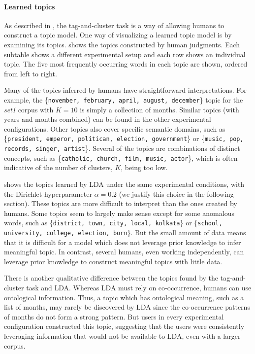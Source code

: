 \paragraph{Learned topics} As described in , the tag-and-cluster
task is a way of allowing humans to construct a topic model.  One way
of visualizing a learned topic model is by examining its topics.
 shows the topics constructed by human
judgments.  Each subtable shows a different experimental setup and
each row shows an individual topic.  The five most frequently
occurring words in each topic are shown, ordered from left to right.

Many of the topics inferred by humans have straightforward
interpretations.  For example, the \{\texttt{november, february,
  april, august, december}\} topic for the \emph{set1} corpus with
$K=10$ is simply a collection of months.  Similar topics (with years
and months combined) can be found in the other experimental
configurations.  Other topics also cover specific semantic domains,
such as \{\texttt{president, emperor, politican, election,
  government}\} or \{\texttt{music, pop, records, singer, artist}\}.
Several of the topics are combinations of distinct concepts, such as
\{\texttt{catholic, church, film, music, actor}\}, which is often
indicative of the number of clusters, $K$, being too low.

 shows the topics learned by LDA under
the same experimental conditions, with the Dirichlet hyperparameter
$\alpha = 0.2$ (we justify this choice in the following section).
These topics are more difficult to interpret than the ones created by
humans.  Some topics seem to largely make sense except for some
anomalous words, such as \{\texttt{district, town, city, local,
  kolkata}\} or \{\texttt{school, university, college, election,
  born}\}.  But the small amount of data means that it is difficult
for a model which does not leverage prior knowledge to infer
meaningful topic.  In contrast, several humans, even working
independently, can leverage prior knowledge to construct meaningful
topics with little data.

There is another qualitative difference between the topics found by
the tag-and-cluster task and LDA.  Whereas LDA must rely on
co-occurrence, humans can use ontological information.  Thus, a topic
which has ontological meaning, such as a list of months, may rarely be
discovered by LDA since the co-occurrence patterns of months do not
form a strong pattern.  But users in every experimental configuration
constructed this topic, suggesting that the users were consistently
leveraging information that would not be available to LDA, even with a
larger corpus.

